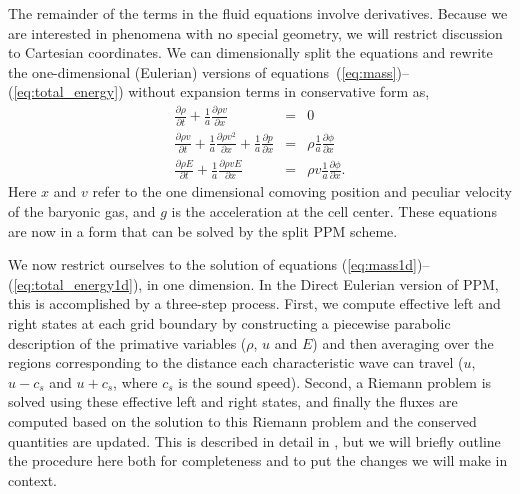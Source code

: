 The remainder of the terms in the fluid equations
involve derivatives.  
Because we are interested in phenomena with no special geometry, we will
restrict discussion to Cartesian coordinates.
We can dimensionally split the equations and rewrite the one-dimensional (Eulerian) 
versions of equations~(\ref{eq:mass})--(\ref{eq:total_energy}) without expansion terms
in conservative form as,
\begin{eqnarray}
\frac{\partial \rho}{\partial t}  + \frac{1}{a} \frac{\partial \rho v }{\partial x}    & = &  
     0 \label{eq:mass1d} \\
\frac{\partial \rho v}{\partial t}  + \frac{1}{a} \frac{\partial \rho v^2}{\partial x}   + 
      \frac{1}{a} \frac{\partial p}{ \partial x} & = & 
      \rho \frac{1}{a} \frac{\partial \phi}{ \partial x}  \label{eq:momentum1d}  \\
\frac{\partial \rho E}{\partial t}  + \frac{1}{a} \frac{\partial \rho v E}{\partial x}  & =  &
      \rho v \frac{1}{a} \frac{\partial \phi}{\partial x}. \label{eq:total_energy1d}
\end{eqnarray}
%
Here $x$ and $v$ refer to the one dimensional comoving position and 
peculiar velocity of the baryonic gas, and $g$ is the acceleration at the cell center.
These equations are now in a form that can be solved by the split PPM scheme.



We now restrict ourselves to the solution of equations
(\ref{eq:mass1d})--(\ref{eq:total_energy1d}), in one
dimension.  In the Direct Eulerian version of PPM, this is
accomplished by a three-step process.  First, we compute effective
left and right states at each grid boundary by constructing a
piecewise parabolic description of the primative variables ($\rho$, $u$
and $E$) and then averaging over the regions corresponding to the
distance each characteristic wave can travel ($u$, $u-c_s$ and
$u+c_s$, where $c_s$ is the sound speed).
Second, a Riemann problem is solved using these effective left and
right states, and finally the fluxes are computed based on the
solution to this Riemann problem and the conserved quantities are
updated.  This is described in detail in
\citet{1984JCoPh..54..174C}, but we will briefly outline the procedure
here both for completeness and to put the changes we will make in
context.



